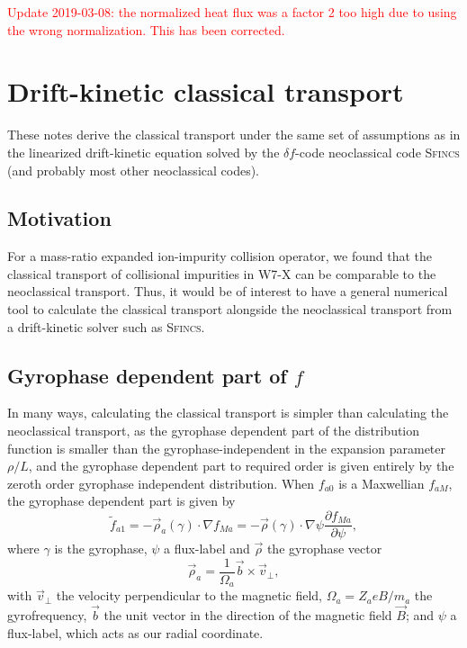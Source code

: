 \documentclass[12pt, a4paper]{article}
\newcommand{\p}{\ensuremath{\partial}}
\begin{document}
\textcolor{red}{Update 2019-03-08: the normalized heat flux was a factor 2 too high due to using the wrong normalization. This has been corrected.}

\section{Drift-kinetic classical transport}
These notes derive the classical transport under the same set of assumptions as in the linearized drift-kinetic equation solved by the $\delta f$-code neoclassical code \textsc{Sfincs} (and probably most other neoclassical codes). 

\subsection{Motivation}
For a mass-ratio expanded ion-impurity collision operator, we found that the classical transport of collisional impurities in W7-X can be comparable to the neoclassical transport. Thus, it would be of interest to have a general numerical tool to calculate the classical transport alongside the neoclassical transport from a drift-kinetic solver such as \textsc{Sfincs}.


\subsection{Gyrophase dependent part of $f$}
In many ways, calculating the classical transport is simpler than calculating the neoclassical transport, as the gyrophase dependent part of the distribution function is smaller than the gyrophase-independent in the expansion parameter $\rho/L$, and the gyrophase dependent part to required order is given entirely by the zeroth order gyrophase independent distribution. When $f_{a0}$ is a Maxwellian $f_{aM}$, the gyrophase dependent part is given by
\begin{equation}
\tilde{f}_{a1} = -\vec{\rho}_a(\gamma) \cdot \nabla f_{Ma} = -\vec{\rho}(\gamma) \cdot \nabla \psi  \frac{\p f_{Ma}}{\p \psi}, \label{eq:ftilde}
\end{equation}
where $\gamma$ is the gyrophase, $\psi$ a flux-label and $\vec{\rho}$ the gyrophase vector
\begin{equation}
\vec{\rho}_a = \frac{1}{\Omega_a}\vec{b} \times \vec{v}_\perp,
\end{equation}
with $\vec{v}_\perp$ the velocity perpendicular to the magnetic field, $\Omega_a=Z_a eB/m_a$ the gyrofrequency, $\vec{b}$ the unit vector in the direction of the magnetic field $\vec{B}$; and $\psi$ a flux-label, which acts as our radial coordinate.
\end{document}
